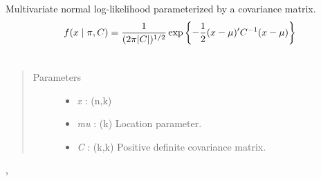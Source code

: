 \documentclass[letterpaper,10pt,english]{sphinxmanual}
\begin{document}
\begin{fulllineitems}
\label{distributions:pymc.distributions.mv_normal_cov_like}
Multivariate normal log-likelihood parameterized by a covariance
matrix.
\begin{gather}
\begin{split}f(x \mid \pi, C) = \frac{1}{(2\pi|C|)^{1/2}} \exp\left\{ -\frac{1}{2} (x-\mu)^{\prime}C^{-1}(x-\mu) \right\}\end{split}\notag\\\begin{split}\end{split}\notag
\end{gather}\begin{quote}\begin{description}
\item[{Parameters }] \leavevmode\begin{itemize}
\item {} 
\emph{x} : (n,k)

\item {} 
\emph{mu} : (k) Location parameter.

\item {} 
\emph{C} : (k,k) Positive definite covariance matrix.

\end{itemize}

\end{description}\end{quote}




{\hyperref[distributions:pymc.distributions.mv_normal_like]{}}, {\hyperref[distributions:pymc.distributions.mv_normal_chol_like]{}}



\end{fulllineitems}

\end{document}
